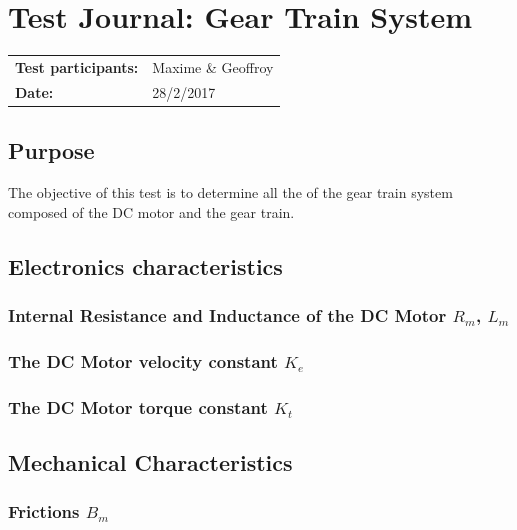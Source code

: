 \graphicspath{{figures/appendix/"Motor&GearTests"/}}
\chapter{Test Journal: Gear Train System}\label{appendix:DCMotorInductance}
\begin{table}[htbp]
\begin{tabular}{l l}
\textbf{Test participants:} & Maxime \& Geoffroy  \\
\textbf{Date:}  & 28/2/2017
\end{tabular}
\end{table}

\section*{Purpose}
The objective of this test is to determine all the of the gear train system composed of the DC motor and the gear train.
\section*{Electronics characteristics}

\subsection*{Internal Resistance and Inductance of the DC Motor $R_m$, $L_m$}


\subsection{The DC Motor velocity constant $K_e$}



\subsection{The DC Motor torque constant $K_t$}


\section{Mechanical Characteristics}

\subsection{Frictions $B_m$}



